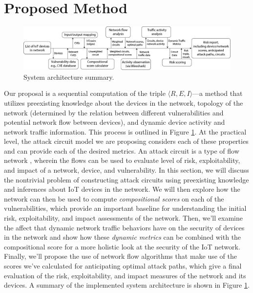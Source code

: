 \section{Proposed Method}
\label{sec:proposed_method}
\begin{figure}[t]
    \centering
    \includegraphics[width=\textwidth]{system_architecture.png}
    \caption{System architecture summary.}
    \label{fig:system_architecture}
\end{figure}
Our proposal is a sequential computation of the triple $\langle R, E, I\rangle$---a method that utilizes preexisting knowledge about the devices in the network, topology of the network (determined by the relation between different vulnerabilities and potential network flow between devices), and dynamic device activity and network traffic information. This process is outlined in Figure \ref{fig:system_architecture}. At the practical level, the attack circuit model we are proposing considers each of these properties and can provide each of the desired metrics. An attack circuit is a type of flow network \cite{goldberg1989network}, wherein the flows can be used to evaluate level of risk, exploitability, and impact of a network, device, and vulnerability. In this section, we will discuss the nontrivial problem of constructing attack circuits using preexisting knowledge and inferences about IoT devices in the network. We will then explore how the network can then be used to compute \textit{compositional scores} on each of the vulnerabilities, which  provide an important baseline for understanding the initial risk, exploitability, and impact assessments of the network. Then, we'll examine the affect that dynamic network traffic behaviors have on the security of devices in the network and show how these \textit{dynamic metrics} can be combined with the compositional score for a more holistic look at the security of the IoT network. Finally, we'll propose the use of network flow algorithms that make use of the scores we've calculated for anticipating optimal attack paths, which give a final evaluation of the risk, exploitability, and impact measures of the network and its devices. A summary of the implemented system architecture is shown in Figure \ref{fig:system_architecture}.

